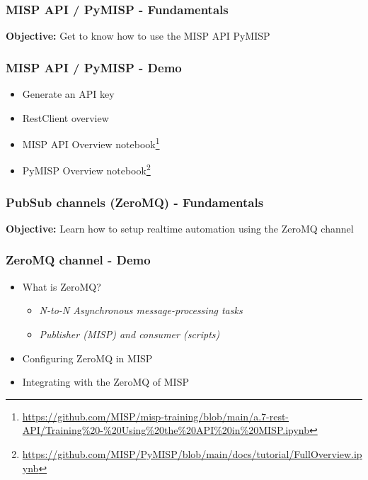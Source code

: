 \begin{frame}
    \frametitle{
        \huge
        MISP API / PyMISP - Fundamentals
        \vspace{1em}
    }
    \textbf{Objective:} Get to know how to use the MISP API \/ PyMISP
\end{frame}

\begin{frame}
    \frametitle{MISP API / PyMISP - Demo}
    \begin{itemize}
        \item Generate an API key
        \item RestClient overview
        \item MISP API Overview notebook\footnote{\url{https://github.com/MISP/misp-training/blob/main/a.7-rest-API/Training\%20-\%20Using\%20the\%20API\%20in\%20MISP.ipynb}}
        \item PyMISP Overview notebook\footnote{\url{https://github.com/MISP/PyMISP/blob/main/docs/tutorial/FullOverview.ipynb}}
    \end{itemize}
\end{frame}

\begin{frame}
    \frametitle{
        \huge
        PubSub channels (ZeroMQ) - Fundamentals
        \vspace{1em}
    }
    \textbf{Objective:} Learn how to setup realtime automation using the ZeroMQ channel
\end{frame}

\begin{frame}
    \frametitle{ZeroMQ channel - Demo}
    \begin{itemize}
        \item What is ZeroMQ?
        \begin{itemize}
            \item \textit{N-to-N Asynchronous message-processing tasks}
            \item \textit{Publisher (MISP) and consumer (scripts)}
        \end{itemize}
        \item Configuring ZeroMQ in MISP
        \item Integrating with the ZeroMQ of MISP
    \end{itemize}
\end{frame}

